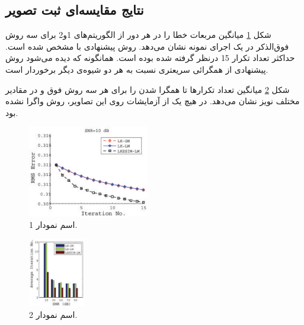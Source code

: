 \documentclass[11pt, twoside]{imsproc}
\begin{document}
\subsection{نتایج مقایسه‌ای ثبت تصویر}

شکل \ref{fig:RMS} میانگین مربعات خطا را در هر دور از الگوریتم‌های 1و2 برای سه روش فوق‌الذکر در یک اجرای نمونه نشان می‌دهد. روش پیشنهادی با  مشخص شده است. حداکثر تعداد تکرار 15 درنظر گرفته شده بوده است. همانگونه که دیده می‌شود روش پیشنهادی از همگرائی سریعتری نسبت به هر دو شیوه‌ی دیگر برخوردار است. 

شکل \ref{fig:Conv_Iter} میانگین تعداد تکرارها تا همگرا شدن را برای هر سه روش فوق و در مقادیر مختلف نویز نشان می‌دهد. در هیچ یک از آزمایشات روی این تصاویر، روش  واگرا نشده بود.
\eject

\begin{figure}[ht]
\centering 
\includegraphics*[height=40mm,width = 0.4\columnwidth]{Fig-2}
\caption{ \small اسم نمودار 1. }
\label{fig:RMS}
\end{figure}

\begin{figure}[ht]
\centering
\includegraphics*[height=30mm, width = 0.3\columnwidth]{Fig-3}
\caption{ \small اسم نمودار 2.}
\label{fig:Conv_Iter}
\end{figure}
\end{document}
